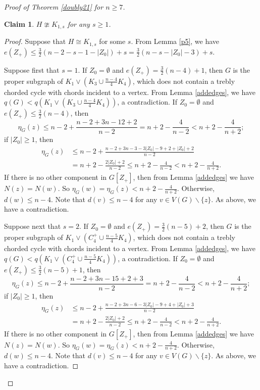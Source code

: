 \documentclass[12pt]{article}
\newtheorem {claim}{Claim}[section]
\begin{document}
\begin{proof}[Proof of Theorem \ref{doubly21} for $n\ge 7$]
\begin{claim}\label{k1s}
$H\ncong K_{1,s}$ for any $s\ge 1$.
\end{claim}
\begin{proof} Suppose that $H\cong K_{1,s}$ for some $s$.
From Lemma \ref{p5}, we have $e(Z_+)\le \frac{3}{2}\left(n-2-s-1-|Z_0|\right)+s=\frac{3}{2}\left(n-s-|Z_0|-3\right)+s$.

Suppose first that $s=1$.
If $Z_0=\emptyset$ and $e(Z_+)=\frac{3}{2}\left(n-4\right)+1$, then $G$ is the proper subgraph of $K_1\vee \left(K_3\cup \frac{n-4}{4}K_4\right)$, which  does not contain a trebly chorded cycle with chords incident to a vertex.
From Lemma \ref{addedges}, we have $q(G)<q\left(K_1\vee \left(K_3\cup \frac{n-4}{4}K_4\right)\right)$, a contradiction.
If $Z_0=\emptyset$ and $e(Z_+)\le\frac{3}{2}\left(n-4\right)$, then
\[
\eta_{G}(z)\le n-2+\frac{n-2+3n-12+2}{n-2}=n+2-\frac{4}{n-2}<n+2-\frac{4}{n+2};
\]
if $|Z_0|\ge 1$, then
\begin{align*}
\eta_G(z)&\le n-2+\frac{n-2+3n-3-3|Z_0|-9+2+|Z_0|+2}{n-2}\\
&=n+2-\frac{2|Z_0|+2}{n-2}\le n+2-\frac{4}{n-2}<n+2-\frac{4}{n+2}.
\end{align*}
If there is no other component in $G[Z_+]$, then from Lemma \ref{addedges} we have $N(z)=N(w)$. So $\eta_G(w)=\eta_G(z)<n+2-\frac{4}{n+2}$. Otherwise, $d(w)\le n-4$.
Note that $d(v)\le n-4$ for any $v\in V(G)\backslash\{z\}$.
As above, we have a contradiction.

Suppose next that $s=2$.
If $Z_0=\emptyset$ and $e(Z_+)=\frac{3}{2}\left(n-5\right)+2$, then $G$ is the proper subgraph of $K_1\vee \left(C_4^+\cup \frac{n-5}{4}K_4\right)$, which does not contain a trebly chorded cycle with chords incident to a vertex.
From Lemma \ref{addedges}, we have $q(G)<q\left(K_1\vee \left(C_4^+\cup \frac{n-5}{4}K_4\right)\right)$, a contradiction.
If $Z_0=\emptyset$ and $e(Z_+)\le\frac{3}{2}\left(n-5\right)+1$, then
\[
\eta_{G}(z)\le n-2+\frac{n-2+3n-15+2+3}{n-2}=n+2-\frac{4}{n-2}<n+2-\frac{4}{n+2};
\]
if $|Z_0|\ge 1$, then
\begin{align*}
\eta_G(z)&\le n-2+\frac{n-2+3n-6-3|Z_0|-9+4+|Z_0|+3}{n-2}\\
&=n+2-\frac{2|Z_0|+2}{n-2}\le n+2-\frac{4}{n-2}<n+2-\frac{4}{n+2}.
\end{align*}
If there is no other component in $G[Z_+]$, then from Lemma \ref{addedges} we have $N(z)=N(w)$. So $\eta_G(w)=\eta_G(z)<n+2-\frac{4}{n+2}$. Otherwise, $d(w)\le n-4$.
Note that $d(v)\le n-4$ for any $v\in V(G)\backslash\{z\}$.
As above, we have a contradiction.


\end{proof}
\end{proof}
\end{document}
